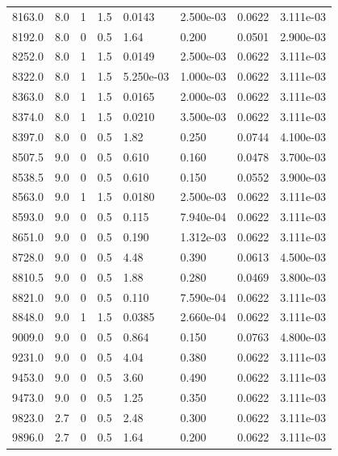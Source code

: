 \documentclass[preview]{standalone}
\begin{document}
{{{{{{\begin{tabular}{L{1.2cm}C{1.2cm} C{0.3cm}C{0.5cm} C{1.4cm}C{1.4cm} C{1.4cm}C{1.4cm}}
  8163.0  &   8.0  & 1     & 1.5 &  0.0143  & 2.500e-03  & 0.0622 &  3.111e-03   \\ 
  8192.0  &   8.0  & 0     & 0.5 &  1.64  & 0.200  & 0.0501 &  2.900e-03   \\ 
  8252.0  &   8.0  & 1     & 1.5 &  0.0149  & 2.500e-03  & 0.0622 &  3.111e-03   \\ 
  8322.0  &   8.0  & 1     & 1.5 &  5.250e-03  & 1.000e-03  & 0.0622 &  3.111e-03   \\ 
  8363.0  &   8.0  & 1     & 1.5 &  0.0165  & 2.000e-03  & 0.0622 &  3.111e-03   \\ 
  8374.0  &   8.0  & 1     & 1.5 &  0.0210  & 3.500e-03  & 0.0622 &  3.111e-03   \\ 
  8397.0  &   8.0  & 0     & 0.5 &  1.82  & 0.250  & 0.0744 &  4.100e-03   \\ 
  8507.5  &   9.0  & 0     & 0.5 &  0.610  & 0.160  & 0.0478 &  3.700e-03   \\ 
  8538.5  &   9.0  & 0     & 0.5 &  0.610  & 0.150  & 0.0552 &  3.900e-03   \\ 
  8563.0  &   9.0  & 1     & 1.5 &  0.0180  & 2.500e-03  & 0.0622 &  3.111e-03   \\ 
  8593.0  &   9.0  & 0     & 0.5 &  0.115  & 7.940e-04  & 0.0622 &  3.111e-03   \\ 
  8651.0  &   9.0  & 0     & 0.5 &  0.190  & 1.312e-03  & 0.0622 &  3.111e-03   \\ 
  8728.0  &   9.0  & 0     & 0.5 &  4.48  & 0.390  & 0.0613 &  4.500e-03   \\ 
  8810.5  &   9.0  & 0     & 0.5 &  1.88  & 0.280  & 0.0469 &  3.800e-03   \\ 
  8821.0  &   9.0  & 0     & 0.5 &  0.110  & 7.590e-04  & 0.0622 &  3.111e-03   \\ 
  8848.0  &   9.0  & 1     & 1.5 &  0.0385  & 2.660e-04  & 0.0622 &  3.111e-03   \\ 
  9009.0  &   9.0  & 0     & 0.5 &  0.864  & 0.150  & 0.0763 &  4.800e-03   \\ 
  9231.0  &   9.0  & 0     & 0.5 &  4.04  & 0.380  & 0.0622 &  3.111e-03   \\ 
  9453.0  &   9.0  & 0     & 0.5 &  3.60  & 0.490  & 0.0622 &  3.111e-03   \\ 
  9473.0  &   9.0  & 0     & 0.5 &  1.25  & 0.350  & 0.0622 &  3.111e-03   \\ 
  9823.0  &   2.7  & 0     & 0.5 &  2.48  & 0.300  & 0.0622 &  3.111e-03   \\ 
  9896.0  &   2.7  & 0     & 0.5 &  1.64  & 0.200  & 0.0622 &  3.111e-03   \\ 

\end{tabular}}}}}}}
\end{document}

